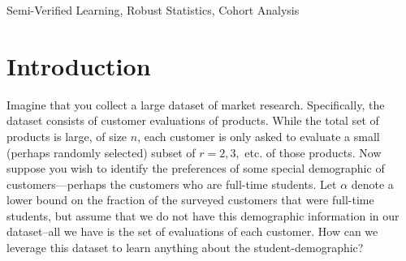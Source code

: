 \documentclass[anon,12pt]{colt2018}
\begin{document}
\begin{keywords}
Semi-Verified Learning, Robust Statistics, Cohort Analysis
\end{keywords}


\section{Introduction}
\begin{comment}
Imagine that you have access to a large dataset of market research.  Specifically, the dataset consists of customer evaluations of products. While the total set of products is large, of size $n$, each customer is only asked to evaluate a small (perhaps randomly selected) subset of $r=2,3,$ etc. of those products.   Long after the dataset is collected, suppose  you wish to identify the preferences of some special demographic of customers---perhaps  the customers who are full-time students.  Let $\alpha$ denote a lower bound on the fraction of the surveyed customers that were full-time students, but assume that we do not have this demographic information in our dataset--all we have is the set of evaluations of each customer.   How can we leverage this dataset to learn anything about the student-demographic?
\end{comment}

Imagine that you collect a large dataset of market research.  Specifically, the dataset consists of customer evaluations of products. While the total set of products is large, of size $n$, each customer is only asked to evaluate a small (perhaps randomly selected) subset of $r=2,3,$ etc. of those products.  Now suppose  you wish to identify the preferences of some special demographic of customers---perhaps  the customers who are full-time students.  Let $\alpha$ denote a lower bound on the fraction of the surveyed customers that were full-time students, but assume that we do not have this demographic information in our dataset--all we have is the set of evaluations of each customer.   How can we leverage this dataset to learn anything about the student-demographic?
\end{document}

